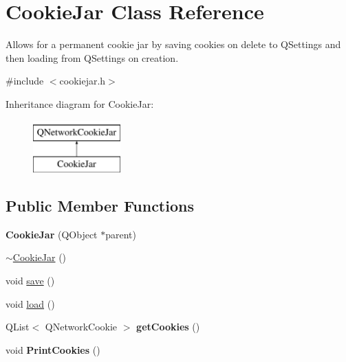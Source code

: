 \hypertarget{classCookieJar}{\section{Cookie\-Jar Class Reference}
\label{classCookieJar}
}


Allows for a permanent cookie jar by saving cookies on delete to Q\-Settings and then loading from Q\-Settings on creation.  




{\ttfamily \#include $<$cookiejar.\-h$>$}

Inheritance diagram for Cookie\-Jar\-:\begin{figure}[H]
\begin{center}
\leavevmode
\includegraphics[height=2.000000cm]{classCookieJar}
\end{center}
\end{figure}
\subsection*{Public Member Functions}
\begin{DoxyCompactItemize}
\item 
\hypertarget{classCookieJar_a9d8362bfcc4d3fb2c5317de3305635a7}{{\bfseries Cookie\-Jar} (Q\-Object $\ast$parent)}\label{classCookieJar_a9d8362bfcc4d3fb2c5317de3305635a7}

\item 
\hyperlink{classCookieJar_ada1a5607a27433955f2b985c6d10bd0a}{$\sim$\-Cookie\-Jar} ()
\item 
void \hyperlink{classCookieJar_aa36822f501cf36baf4984ce9920bfb75}{save} ()
\item 
void \hyperlink{classCookieJar_ab58f94721665cfcf1eb24b140abe53f8}{load} ()
\item 
\hypertarget{classCookieJar_aa887fb809d2206d4d03e623310fba49a}{Q\-List$<$ Q\-Network\-Cookie $>$ {\bfseries get\-Cookies} ()}\label{classCookieJar_aa887fb809d2206d4d03e623310fba49a}

\item 
\hypertarget{classCookieJar_ac2659e9f1aca758ba2b56bbde81a6e21}{void {\bfseries Print\-Cookies} ()}\label{classCookieJar_ac2659e9f1aca758ba2b56bbde81a6e21}

\end{DoxyCompactItemize}
